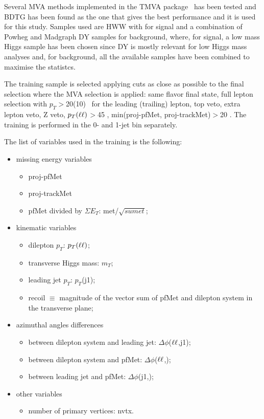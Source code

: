 Several MVA methods implemented in the TMVA package~\cite{TMVA2007} has been tested and BDTG has been found as
the one that gives the best performance and it is used for this study.
Samples used are HWW with  \GeVcc for signal and a combination of Powheg and Madgraph DY samples for background,
where, for signal, a low mass Higgs sample has been chosen since DY is mostly relevant for low Higgs mass analyses and,
for background, all the available samples have been combined to maximise the statistcs.

The training sample is selected applying cuts as close as possible to the final selection where the MVA selection is applied: 
same flavor final state, full lepton selection with $p_T$$>$20(10) \GeVc\ for the leading (trailing) lepton, 
top veto, extra lepton veto, Z veto, $p_T(\ell\ell)$$>$45 \GeVc, min(proj-pfMet, proj-trackMet)$>$20 \GeVc.
The training is performed in the 0- and 1-jet bin separately.

The list of variables used in the training is the following:
\begin{itemize}
\item missing energy variables
\begin{itemize}
\item proj-pfMet
\item proj-trackMet
\item pfMet divided by $\Sigma E_T$: met/$\sqrt{sumet}$;
\end{itemize}
\item kinematic variables
\begin{itemize}
\item dilepton $p_T$: $p_T(\ell\ell)$;
\item transverse Higgs mass: $m_T$;
\item leading jet $p_T$: $p_T$(j1);
\item recoil $\equiv$ magnitude of the vector sum of pfMet and dilepton system in the transverse plane;
\end{itemize}
\item azimuthal angles differences
\begin{itemize}
\item between dilepton system and leading jet: $\Delta\phi$($\ell\ell$,j1);
\item between dilepton system and pfMet: $\Delta\phi$($\ell\ell$,\met);
\item between leading jet and pfMet: $\Delta\phi$(j1,\met);
\end{itemize}
\item other variables
\begin{itemize}
\item number of primary vertices: nvtx.
\end{itemize}
\end{itemize}

